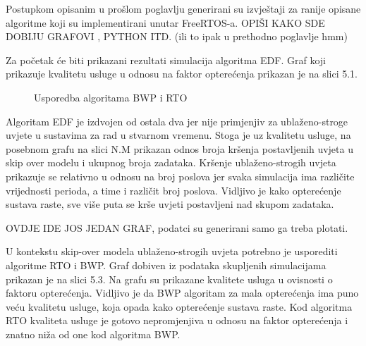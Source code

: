 \documentclass[../zavrsni.tex]{subfiles}
\begin{document}
Postupkom opisanim u prošlom poglavlju generirani su izvještaji za ranije opisane algoritme koji su implementirani unutar FreeRTOS-a.
OPIŠI KAKO SDE DOBIJU GRAFOVI , PYTHON ITD. (ili to ipak u prethodno poglavlje hmm) 

Za početak će biti prikazani rezultati simulacija algoritma EDF. Graf koji prikazuje kvalitetu usluge u odnosu na faktor opterećenja 
prikazan je na slici 5.1. 
\begin{figure}[!htb]
    \caption{\label{fig:my-label} Usporedba algoritama BWP i RTO}
\end{figure}
Algoritam EDF je izdvojen od ostala dva jer nije primjenjiv za ublaženo-stroge
uvjete u sustavima za rad u stvarnom vremenu. Stoga je uz kvalitetu usluge, na posebnom grafu na slici N.M prikazan odnos broja kršenja 
postavljenih uvjeta u skip over modelu i ukupnog broja zadataka. Kršenje ublaženo-strogih uvjeta prikazuje se relativno u odnosu na broj 
poslova jer svaka simulacija ima različite vrijednosti perioda, a time i različit broj poslova.
Vidljivo je kako opterećenje sustava raste, sve više puta se krše uvjeti postavljeni nad 
skupom zadataka.

OVDJE IDE JOS JEDAN GRAF, podatci su generirani samo ga treba plotati.

U kontekstu skip-over modela ublaženo-strogih uvjeta potrebno je usporediti algoritme RTO i BWP. Graf dobiven iz podataka skupljenih simulacijama
prikazan je na slici 5.3. Na grafu su prikazane kvalitete usluga u ovisnosti o faktoru opterećenja. Vidljivo je da BWP algoritam za mala 
opterećenja ima puno veću kvalitetu usluge, koja opada kako opterećenje sustava raste. Kod algoritma RTO kvaliteta usluge je gotovo nepromjenjiva
u odnosu na faktor opterećenja i znatno niža od one kod algoritma BWP. 
\end{document}
